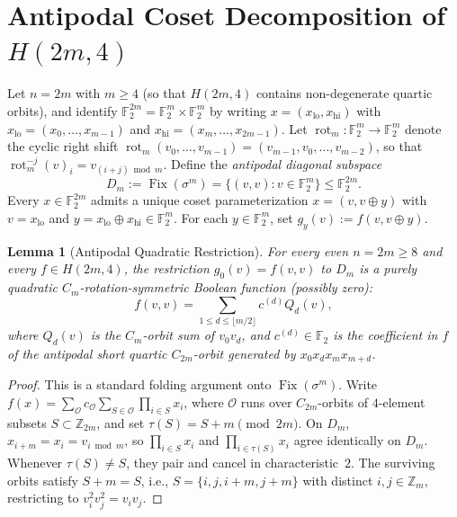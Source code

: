 \documentclass[11pt,a4paper]{article}
\newtheorem{lemma}[theorem]{Lemma}
\theoremstyle{definition}
\newcommand{\F}{\mathbb{F}_2}
\newcommand{\Z}{\mathbb{Z}}
\newcommand{\rot}{\operatorname{rot}}
\newcommand{\Fix}{\operatorname{Fix}}
\begin{document}
\section{Antipodal Coset Decomposition of $H(2m, 4)$}
\label{sec:universal}

Let $n = 2m$ with $m \ge 4$ (so that $H(2m,4)$ contains non-degenerate quartic orbits), and identify $\F^{2m} = \F^m \times \F^m$ by writing $x = (x_{\mathrm{lo}}, x_{\mathrm{hi}})$ with $x_{\mathrm{lo}} = (x_0, \dots, x_{m-1})$ and $x_{\mathrm{hi}} = (x_m, \dots, x_{2m-1})$. Let $\rot_m:\F^m \to \F^m$ denote the cyclic right shift $\rot_m(v_0, \dots, v_{m-1}) = (v_{m-1}, v_0, \dots, v_{m-2})$, so that $\rot_m^{-j}(v)_i = v_{(i+j)\bmod m}$. Define the \emph{antipodal diagonal subspace}
\[
  D_m := \Fix(\sigma^m) = \{(v, v) : v \in \F^m\} \le \F^{2m}.
\]
Every $x \in \F^{2m}$ admits a unique coset parameterization $x = (v, v \oplus y)$ with $v = x_{\mathrm{lo}}$ and $y = x_{\mathrm{lo}} \oplus x_{\mathrm{hi}} \in \F^m$. For each $y \in \F^m$, set $g_y(v) := f(v, v \oplus y)$.

\begin{lemma}[Antipodal Quadratic Restriction]
\label{lem:quad_diag}
For every even $n=2m \ge 8$ and every $f \in H(2m,4)$, the restriction $g_0(v) = f(v,v)$ to $D_m$ is a purely quadratic $C_m$-rotation-symmetric Boolean function (possibly zero):
\[
  f(v,v) = \sum_{1 \le d \le \lfloor m/2 \rfloor} c^{(d)} Q_d(v),
\]
where $Q_d(v)$ is the $C_m$-orbit sum of $v_0 v_d$, and $c^{(d)} \in \F$ is the coefficient in $f$ of the antipodal short quartic $C_{2m}$-orbit generated by $x_0 x_d x_m x_{m+d}$.
\end{lemma}
\begin{proof}
This is a standard folding argument onto $\Fix(\sigma^m)$. Write $f(x) = \sum_{\mathcal{O}} c_{\mathcal{O}} \sum_{S \in \mathcal{O}} \prod_{i \in S} x_i$, where $\mathcal{O}$ runs over $C_{2m}$-orbits of $4$-element subsets $S \subset \Z_{2m}$, and set $\tau(S) = S + m \pmod{2m}$. On $D_m$, $x_{i+m} = x_i = v_{i \bmod m}$, so $\prod_{i \in S} x_i$ and $\prod_{i \in \tau(S)} x_i$ agree identically on $D_m$. Whenever $\tau(S) \neq S$, they pair and cancel in characteristic~$2$. The surviving orbits satisfy $S + m = S$, i.e., $S = \{i, j, i+m, j+m\}$ with distinct $i, j \in \Z_m$, restricting to $v_i^2 v_j^2 = v_i v_j$.
\end{proof}
\end{document}
